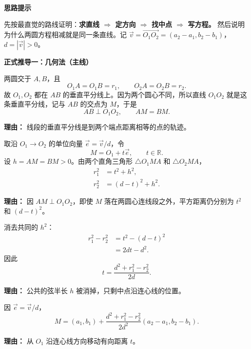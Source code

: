 \begin{proofbox}
	\textbf{\textcolor{CProof}{思路提示}}

	先按最直觉的路线证明：\textbf{求直线 $\Rightarrow$ 定方向 $\Rightarrow$ 找中点 $\Rightarrow$ 写方程。} 然后说明为什么两圆方程相减就是同一条直线。记 $\vec v=\overrightarrow{O_1O_2}=(a_2-a_1,b_2-b_1)$，$d=|\vec v|>0$。

	\medskip
	\textbf{\textcolor{CProof}{正式推导一：几何法（主线）}}
	\begin{description}[style=nextline, leftmargin=2.8em, labelsep=0.5em, itemsep=0.55em]
		\item[\textbf{步骤一（从两端点的等距关系定方向）：}] 两圆交于 $A,B$，且
		\[
			O_1A=O_1B=r_1,\qquad O_2A=O_2B=r_2.
		\]
		故 $O_1,O_2$ 都在 $AB$ 的垂直平分线上。因为两个圆心不同，所以直线 $O_1O_2$ 就是这条垂直平分线，记与 $AB$ 的交点为 $M$，于是
		\[
			AB\perp O_1O_2,\qquad AM=BM.
		\]
		\par\textbf{理由：} 线段的垂直平分线是到两个端点距离相等的点的轨迹。

		\item[\textbf{步骤二（将中点位置变成一个数）：}] 取沿 $O_1\to O_2$ 的单位向量 $\vec e=\vec v/d$，令
		\[
			M=O_1+t\vec e,\qquad t\in\mathbb R.
		\]
		设 $h=AM=BM>0$。由两个直角三角形 $\triangle O_1MA$ 和 $\triangle O_2MA$，
		\[
			\begin{aligned}
				r_1^2&=t^2+h^2,\\
				r_2^2&=(d-t)^2+h^2.
			\end{aligned}
		\]
		\par\textbf{理由：} 因 $AM\perp O_1O_2$，即使 $M$ 落在两圆心连线段之外，平方距离仍分别为 $t^2$ 和 $(d-t)^2$。

		\item[\textbf{步骤三（两个勾股方程相减）：}] 消去共同的 $h^2$：
		\[
			\begin{aligned}
				r_1^2-r_2^2
				&=t^2-(d-t)^2\\
				&=2dt-d^2.
			\end{aligned}
		\]
		因此
		\[
			\boxed{t=\frac{d^2+r_1^2-r_2^2}{2d}}.
		\]
		\par\textbf{理由：} 公共的弦半长 $h$ 被消掉，只剩中点沿连心线的位置。

		\item[\textbf{步骤四（由距离求中点坐标）：}] 因 $\vec e=\vec v/d$，
		\[
			\boxed{M=(a_1,b_1)+\frac{d^2+r_1^2-r_2^2}{2d^2}(a_2-a_1,b_2-b_1)}.
		\]
		\par\textbf{理由：} 从 $O_1$ 沿连心线方向移动有向距离 $t$。


\end{description}
\end{proofbox}
